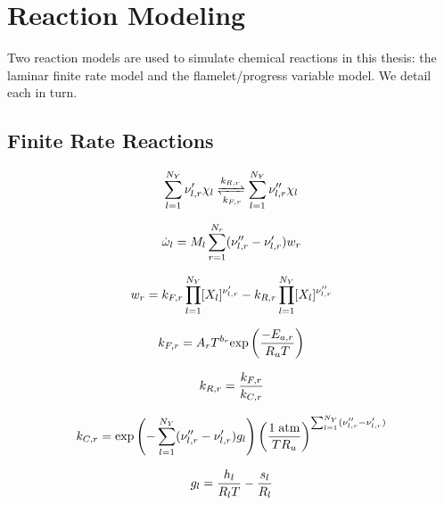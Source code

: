 \section{Reaction Modeling}

Two reaction models are used to simulate chemical reactions in this thesis: the laminar finite rate model and the flamelet/progress variable model. We detail each in turn.

\subsection{Finite Rate Reactions}\label{sec:finiterate}

\begin{equation}
	\specSumAll \stoichCoefSpecReac' \chi_\specIdx \xrightleftharpoons[\forwardRateReac]{\reverseRateReac} \specSumAll \stoichCoefSpecReac'' \chi_\specIdx
\end{equation}

\begin{equation}
	\dot{\omega}_{l} = M_{l} \sum_{r = 1}^{N_r} (\nu_{l,r}'' - \nu_{l,r}') w_{r}
\end{equation}

\begin{equation}
	w_{r} = k_{F,r} \prod_{l=1}^{N_Y} [X_{l}]^{\nu_{l,r}'} - k_{R,r} \prod_{l=1}^{N_Y} [X_{l}]^{\nu_{l,r}''}
\end{equation}

\begin{equation}
	k_{F,r} = A_{r} T^{b_{r}} \text{exp} \left( \frac{-E_{a,r}}{R_u T} \right)
\end{equation}

\begin{equation}
	k_{R,r} = \frac{k_{F,r}}{k_{C,r}}
\end{equation}

\begin{equation}
	k_{C,r} = \text{exp}\left(-\sum_{l = 1}^{N_Y} (\nu_{l,r}'' - \nu_{l,r}') g_{l}\right) \left(\frac{1 \; \text{atm}}{T R_u}\right)^{\sum_{l = 1}^{N_Y} (\nu_{l,r}'' - \nu_{l,r}')}
\end{equation}

\begin{equation}\label{eq:gibbsSpec}
	g_{l} = \frac{h_{l}}{R_{l} T} - \frac{s_{l}}{R_{l}}
\end{equation}

